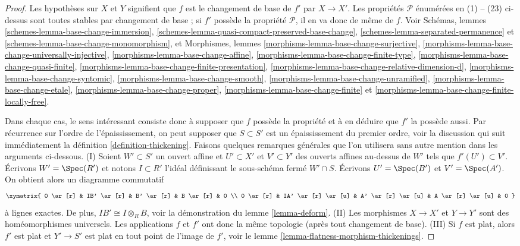 \begin{proof}
Les hypothèses sur $X$ et $Y$ signifient que $f$ est le changement de base de
$f'$ par $X \to X'$.
Les propriétés $\mathcal{P}$ énumérées en (1) -- (23) ci-dessus sont toutes stables
par changement de base ; si $f'$ possède la propriété $\mathcal{P}$,
il en va donc de même de $f$. Voir
Schémas, lemmes \ref{schemes-lemma-base-change-immersion},
\ref{schemes-lemma-quasi-compact-preserved-base-change},
\ref{schemes-lemma-separated-permanence} et
\ref{schemes-lemma-base-change-monomorphism},
et
Morphismes, lemmes
\ref{morphisms-lemma-base-change-surjective},
\ref{morphisms-lemma-base-change-universally-injective},
\ref{morphisms-lemma-base-change-affine},
\ref{morphisms-lemma-base-change-finite-type},
\ref{morphisms-lemma-base-change-quasi-finite},
\ref{morphisms-lemma-base-change-finite-presentation},
\ref{morphisms-lemma-base-change-relative-dimension-d},
\ref{morphisms-lemma-base-change-syntomic},
\ref{morphisms-lemma-base-change-smooth},
\ref{morphisms-lemma-base-change-unramified},
\ref{morphisms-lemma-base-change-etale},
\ref{morphisms-lemma-base-change-proper},
\ref{morphisms-lemma-base-change-finite} et
\ref{morphisms-lemma-base-change-finite-locally-free}.

\medskip\noindent
Dans chaque cas, le sens intéressant consiste donc à supposer
que $f$ possède la propriété et à en déduire que $f'$ la possède aussi.
Par récurrence sur l'ordre de l'épaississement, on peut
supposer que $S \subset S'$ est un épaississement du premier ordre, voir
la discussion qui suit immédiatement
la définition \ref{definition-thickening}.
Faisons quelques remarques générales que l'on utilisera sans autre
mention dans les arguments ci-dessous.
(I) Soient $W' \subset S'$ un ouvert affine et $U' \subset X'$
et $V' \subset Y'$ des ouverts affines au-dessus de $W'$ tels que $f'(U') \subset V'$.
Écrivons $W' = \Spec(R')$ et notons $I \subset R'$ l'idéal
définissant le sous-schéma fermé $W' \cap S$. Écrivons $U' = \Spec(B')$
et $V' = \Spec(A')$. On obtient alors un diagramme commutatif
$$
\xymatrix{
0 \ar[r] &
IB' \ar[r] &
B' \ar[r] &
B \ar[r] & 0 \\
0 \ar[r] &
IA' \ar[r] \ar[u] &
A' \ar[r] \ar[u] &
A \ar[r] \ar[u] & 0
}
$$
à lignes exactes. De plus, $IB' \cong I \otimes_R B$, voir la démonstration du
lemme \ref{lemma-deform}.
(II) Les morphismes $X \to X'$ et $Y \to Y'$ sont des homéomorphismes universels.
Les applications $f$ et $f'$ ont donc la même topologie (après tout changement de base).
(III) Si $f$ est plat, alors $f'$ est plat et
$Y' \to S'$ est plat en tout point de l'image de $f'$, voir
le lemme \ref{lemma-flatness-morphism-thickenings}.


\end{proof}

